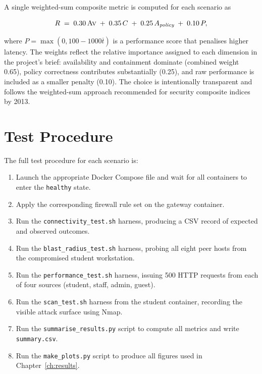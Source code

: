 A single weighted-sum composite metric is computed for each scenario as

\begin{equation}
R \;=\; 0.30\,\textsc{Av} \;+\; 0.35\,C \;+\; 0.25\,A_{\textit{policy}} \;+\; 0.10\,P,
\label{eq:reliability}
\end{equation}

where $P = \max(0, 100 - 1000\overline{t})$ is a performance score that penalises higher latency. The weights reflect the relative importance assigned to each dimension in the project's brief: availability and containment dominate (combined weight 0.65), policy correctness contributes substantially (0.25), and raw performance is included as a smaller penalty (0.10). The choice is intentionally transparent and follows the weighted-sum approach recommended for security composite indices by \textcite{Cherdantseva and Hilton}{2013}.

\section{Test Procedure}

The full test procedure for each scenario is:

\begin{enumerate}[label=\arabic*., leftmargin=*]
    \item Launch the appropriate Docker Compose file and wait for all containers to enter the \texttt{healthy} state.
    \item Apply the corresponding firewall rule set on the gateway container.
    \item Run the \texttt{connectivity\_test.sh} harness, producing a CSV record of expected and observed outcomes.
    \item Run the \texttt{blast\_radius\_test.sh} harness, probing all eight peer hosts from the compromised student workstation.
    \item Run the \texttt{performance\_test.sh} harness, issuing 500 HTTP requests from each of four sources (student, staff, admin, guest).
    \item Run the \texttt{scan\_test.sh} harness from the student container, recording the visible attack surface using Nmap.
    \item Run the \texttt{summarise\_results.py} script to compute all metrics and write \texttt{summary.csv}.
    \item Run the \texttt{make\_plots.py} script to produce all figures used in Chapter~\ref{ch:results}.
\end{enumerate}

